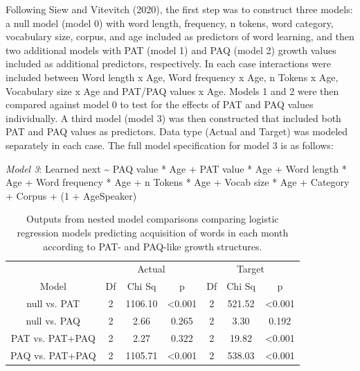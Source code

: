 \documentclass[
  man]{apa6}
\begin{document}
Following Siew and Vitevitch (2020), the first step was to construct three models: a null model (model 0) with word length, frequency, n tokens, word category, vocabulary size, corpus, and age included as predictors of word learning, and then two additional models with PAT (model 1) and PAQ (model 2) growth values included as additional predictors, respectively. In each case interactions were included between Word length x Age, Word frequency x Age, n Tokens x Age, Vocabulary size x Age and PAT/PAQ values x Age. Models 1 and 2 were then compared against model 0 to test for the effects of PAT and PAQ values individually. A third model (model 3) was then constructed that included both PAT and PAQ values as predictors. Data type (Actual and Target) was modeled separately in each case. The full model specification for model 3 is as follows:

\emph{Model 3}: Learned next \textasciitilde{} PAQ value * Age +
PAT value * Age +
Word length * Age +
Word frequency * Age +
n Tokens * Age +
Vocab size * Age +
Category +
Corpus +
(1 + Age\textbar Speaker)

\begin{longtable}[t]{ccccccc}
\caption{\label{tab:table-model-outputs}Outputs from nested model comparisons comparing logistic regression models predicting acquisition of words in each month according to PAT- and PAQ-like growth structures.}\\
\toprule
\multicolumn{1}{c}{ } & \multicolumn{3}{c}{Actual} & \multicolumn{3}{c}{Target} \\
\cmidrule(l{3pt}r{3pt}){2-4} \cmidrule(l{3pt}r{3pt}){5-7}
Model & Df & Chi Sq & p & Df & Chi Sq & p\\
\midrule
null vs. PAT & 2 & 1106.10 & <0.001 & 2 & 521.52 & <0.001\\
null vs. PAQ & 2 & 2.66 & 0.265 & 2 & 3.30 & 0.192\\
PAT vs. PAT+PAQ & 2 & 2.27 & 0.322 & 2 & 19.82 & <0.001\\
PAQ vs. PAT+PAQ & 2 & 1105.71 & <0.001 & 2 & 538.03 & <0.001\\
\midrule
\bottomrule
\end{longtable}
\end{document}
